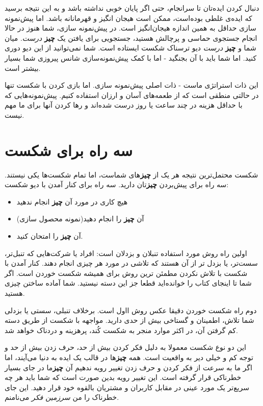 دنبال کردن ایده‌تان تا سرانجام، حتی اگر پایان خوبی نداشته باشد و به این
نتیجه برسید که ایده‌ی غلطی بوده‌است، ممکن است هیجان انگیز و قهرمانانه
باشد. اما پیش‌نمونه سازی حداقل به همین اندازه هیجان‌انگیز است. در
پیش‌نمونه سازی، شما هنوز در حالا انجام جستجوی حماسی و پرچالش هستید،
جستجویی برای یافتن یک \textbf{چیز} \emph{درست}. میان شما و \textbf{چیز}
\emph{درست} دیو ترسناک شکست ایستاده است. شما نمی‌توانید از این دیو دوری
کنید. اما شما باید با آن بجنگید - اما با کمک پیش‌نمونه‌سازی شانس پیروزی
شما بسیار بیشتر است.

این ذات استراتژی ماست - ذات اصلی پیش‌نمونه سازی. اما بازی کردن با شکست
تنها در حالتی منطقی است که از طعمه‌های آسان و ارزان استفاده کنیم.
پیش‌نمونه‌هایی که با حداقل هزینه در چند ساعت یا روز درست شده‌اند و رها
کردن آنها برای ما مهم نیست.

\section{سه راه برای
شکست}\label{ux633ux647-ux631ux627ux647-ux628ux631ux627ux6cc-ux634ux6a9ux633ux62a}

شکست محتمل‌ترین نتیجه هر یک از \textbf{چیز}های شماست، اما تمام شکست‌ها
یکی نیستند. سه راه برای پیش‌بردن \textbf{چیز}تان دارید. سه راه برای کنار
آمدن با دیو شکست:

\begin{itemize}

\item
  هیچ کاری در مورد آن \textbf{چیز} انجام ندهید
\item
  آن \textbf{چیز} را انجام دهید(نمونه محصول سازی)
\item
  آن \textbf{چیز} را امتحان کنید.
\end{itemize}

اولین راه روش مورد استفاده تنبلان و بزدلان است: افراد یا شرکت‌هایی که
تنبل‌تر، سست‌تر، یا بزدل تر از آن هستند که تلاشی در مورد هر چیزی انجام
دهند. کنار آمدن با شکست با تلاش نکردن مطمئن ترین روش برای همیشه شکست
خوردن است. اگر شما تا اینجای کتاب را خوانده‌اید قطعا جز این دسته نیستید.
شما آماده ساختن چیزی هستید.

دوم راه شکست خوردن دقیقا عکس روش ااول است. برخلاف تنبلی، سستی یا بزدلی
شما تلاش، اطمینان و گستاخی بیش از حدی دارید. مواجهه با شکست از طریق دسته
کم گرفتن آن، در اکثر موارد منجر به شکست کُند، پرهزینه و دردناک خواهد شد.

این دو نوع شکست معمولا به دلیل فکر کردن بیش از حد، حرف زدن بیش از حد و
توجه کم و خیلی دیر به واقعیت است. همه \textbf{چیز}ها در قالب یک ایده به
دنیا می‌آیند، اما اگر ما به سرعت از فکر کردن و حرف زدن تغییر رویه ندهیم
آن \textbf{چیز}ما در جای بسیار خطرناکی قرار گرفته است. این تغییر رویه
بدین صورت است که شما باید هر چه سریع‌تر یک مورد عینی در مقابل کاربران و
مشتریان بالقوه خود قرار دهید. این جای خطرناک را من \emph{سرزمین فکر}
می‌نامنم.

